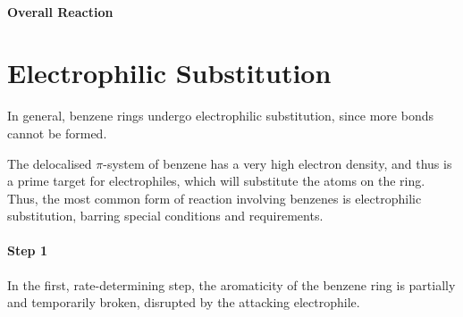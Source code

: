 			\paragraph{Overall Reaction}





































	\pagebreak
	\hypertarget{AppendixElectrophilicSubstitution}{}
	\section{Electrophilic Substitution}

		In general, benzene rings undergo electrophilic substitution, since more bonds cannot be formed.

		The delocalised $\pi$-system of benzene has a very high electron density, and thus is a prime target for electrophiles, which
		will substitute the  atoms on the ring. Thus, the most common form of reaction involving benzenes is electrophilic
		substitution, barring special conditions and requirements.

		\paragraph{Step 1}

		In the first, rate-determining step, the aromaticity of the benzene ring is partially and temporarily broken, disrupted by
		the attacking electrophile.

